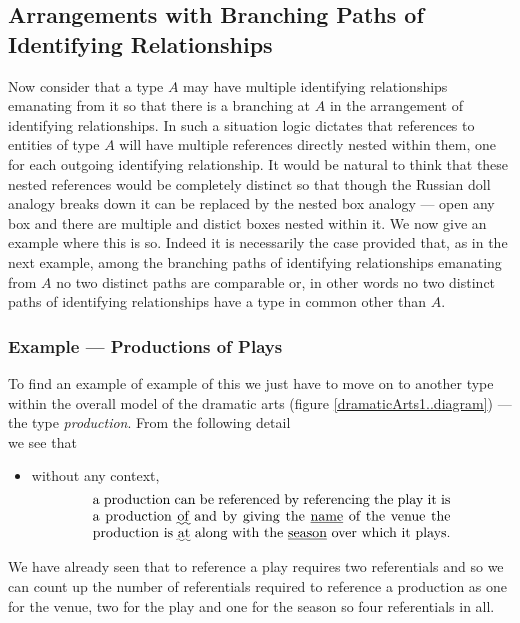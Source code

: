 \subsection{Arrangements with Branching Paths of Identifying Relationships}
Now consider that a type $A$ may have multiple identifying relationships emanating from it so that there is a branching at $A$ in the
arrangement of identifying relationships.
In such a situation logic dictates that references to entities of type $A$ will have multiple references directly nested within them, one for each outgoing identifying relationship.
It would be natural to think that these nested references would be completely distinct so that though the Russian doll analogy breaks down it can be replaced by the nested box analogy --- open any box and there are multiple and distict boxes nested within it. 
We now give an example where this is so. Indeed it is necessarily the case provided that, as in the next example,
 among the branching paths of identifying relationships emanating from $A$ 
no two distinct paths are comparable or, in other words no two distinct paths of identifying relationships have a type in common other than $A$. 

\subsubsection{Example --- Productions of Plays}

\label{exampleReferencingProductions}

To find an example of example of this we just have to move on to another type within the overall model of the dramatic arts (figure \ref{dramaticArts1..diagram})
 --- the type \textit{production}. From the following detail 
\begin{equation*}

\end{equation*}
we see that
\begin{itemize}
  \item
  without any context, 
  \begin{equation} 
\label{absoluteProductionReferencing}
\text{\parbox{9cm}{a production can be referenced by referencing the play it is a production \uwave{of} 
  and by giving the \underline{name} of the venue  the production is \uwave{at} along with the \underline{season} 
  over which it plays.}}
\end{equation}
\end{itemize}
We have already seen that to reference a play requires two referentials and so
we can count up the number of referentials required to reference a production
as one for the venue, two for the play and one for the season so four referentials in all. 

